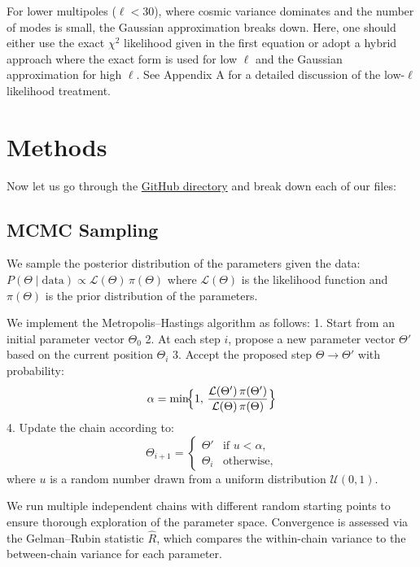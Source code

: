 \documentclass[11pt]{article}
\theoremstyle{definition}
\begin{document}
For lower multipoles ($\ell<30$), where cosmic variance dominates and the number of modes is small, the Gaussian approximation breaks down. Here, one should either use the exact $\chi^2$ likelihood given in the first equation or adopt a hybrid approach where the exact form is used for low $\ell$ and the Gaussian approximation for high $\ell$. See Appendix A for a detailed discussion of the low-$\ell$ likelihood treatment.




\section{Methods}
Now let us go through the \href{https://github.com/davidturturean/Phys212_Spring2025Project}{GitHub directory} and break down each of our files:

\subsection{MCMC Sampling}
We sample the posterior distribution of the parameters given the data:
\(\displaystyle P(\Theta\mid\mathrm{data})\propto \mathcal{L}(\Theta)\,\pi(\Theta)\)
where $\mathcal{L}(\Theta)$ is the likelihood function and $\pi(\Theta)$ is the prior distribution of the parameters.

We implement the Metropolis–Hastings algorithm as follows:
1. Start from an initial parameter vector $\Theta_0$
2. At each step $i$, propose a new parameter vector $\Theta'$ based on the current position $\Theta_i$
3. Accept the proposed step $\Theta\to\Theta'$ with probability:
\begin{equation}
  \alpha = \min\!\Bigl\{1,\,
    \frac{\mathcal{L}(\Theta')\,\pi(\Theta')}
         {\mathcal{L}(\Theta)\,\pi(\Theta)}
  \Bigr\}
\end{equation}
4. Update the chain according to:
\[
  \Theta_{i+1} =
  \begin{cases}
    \Theta' & \text{if }u<\alpha,\\
    \Theta_i & \text{otherwise},
  \end{cases}
\]
where $u$ is a random number drawn from a uniform distribution $\mathcal{U}(0,1)$.

We run multiple independent chains with different random starting points to ensure thorough exploration of the parameter space. Convergence is assessed via the Gelman–Rubin statistic \(\widehat{R}\), which compares the within-chain variance to the between-chain variance for each parameter. 
\end{document}
